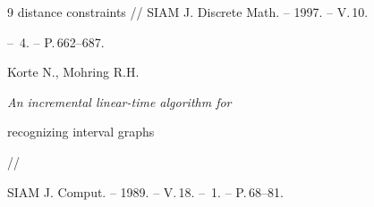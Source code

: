 \begin{thebibliography}{9}
{distance constraints} // SIAM J. Discrete Math. -- 1997. -- V.\,10. 


-- \No\,4. -- P.\,662--687. 




Korte N., Mohring R.H. {\em An incremental linear-time algorithm for 


recognizing interval graphs} // 


SIAM J. Comput. -- 1989. -- V.\,18. -- \No\,1. -- P.\,68--81. 


 


\end{thebibliography} 


 


\vskip 0.3cm 


 








 


\label{end} 


 






